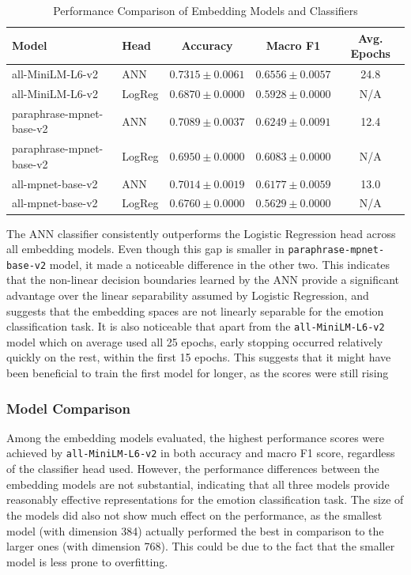 \documentclass[runningheads]{llncs}
\begin{document}
\begin{table}[H]
    \centering
    \begin{tabular}{llccc}
        \hline
        \textbf{Model} & \textbf{Head} & \textbf{Accuracy} & \textbf{Macro F1} & \textbf{Avg. Epochs} \\ \hline
        all-MiniLM-L6-v2 & ANN & $0.7315 \pm 0.0061$ & $0.6556 \pm 0.0057$ & 24.8 \\ 
        all-MiniLM-L6-v2 & LogReg & $0.6870 \pm 0.0000$ & $0.5928 \pm 0.0000$ & N/A \\ 
        paraphrase-mpnet-base-v2 & ANN & $0.7089 \pm 0.0037$ & $0.6249 \pm 0.0091$ & 12.4 \\ 
        paraphrase-mpnet-base-v2 & LogReg & $0.6950 \pm 0.0000$ & $0.6083 \pm 0.0000$ & N/A \\ 
        all-mpnet-base-v2 & ANN & $0.7014 \pm 0.0019$ & $0.6177 \pm 0.0059$ & 13.0 \\ 
        all-mpnet-base-v2 & LogReg & $0.6760 \pm 0.0000$ & $0.5629 \pm 0.0000$ & N/A \\ 
        \hline
    \end{tabular}
    \caption{Performance Comparison of Embedding Models and Classifiers}
    \label{tab:model_comparison}
\end{table}

\noindent
The ANN classifier consistently outperforms the Logistic Regression head across all embedding models. Even though this gap is smaller in \texttt{paraphrase-mpnet-base-v2} model, it made a noticeable difference in the other two. This indicates that the non-linear decision boundaries learned by the ANN provide a significant advantage over the linear separability assumed by Logistic Regression, and suggests that the embedding spaces are not linearly separable for the emotion classification task. It is also noticeable that apart from the \texttt{all-MiniLM-L6-v2} model which on average used all 25 epochs, early stopping occurred relatively quickly on the rest, within the first 15 epochs. This suggests that it might have been beneficial to train the first model for longer, as the scores were still rising

\subsubsection{Model Comparison} Among the embedding models evaluated, the highest performance scores were achieved by \texttt{all-MiniLM-L6-v2} in both accuracy and macro F1 score, regardless of the classifier head used. However, the performance differences between the embedding models are not substantial, indicating that all three models provide reasonably effective representations for the emotion classification task. The size of the models did also not show much effect on the performance, as the smallest model (with dimension 384) actually performed the best in comparison to the larger ones (with dimension 768). This could be due to the fact that the smaller model is less prone to overfitting.
\end{document}
